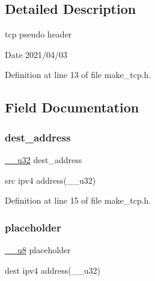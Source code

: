 \subsection{Detailed Description}
tcp pseudo header 

\begin{DoxyDate}{Date}
2021/04/03 
\end{DoxyDate}


Definition at line 13 of file make\+\_\+tcp.\+h.



\subsection{Field Documentation}
\mbox{\label{structtcp__pseudo__header_ad1dfa6f7871245086b831aa281f958d5}} 
\subsubsection{\texorpdfstring{dest\+\_\+address}{dest\_address}}
{\footnotesize\ttfamily \hyperlink{asm__types_8h_a3acae9310e2c2e411e800a8a369171c6}{\+\_\+\+\_\+u32} dest\+\_\+address}



src ipv4 address(\+\_\+\+\_\+u32) 



Definition at line 15 of file make\+\_\+tcp.\+h.

\mbox{\label{structtcp__pseudo__header_ae4b2c60e0c518e7aec8d55eca6de4d4c}} 
\subsubsection{\texorpdfstring{placeholder}{placeholder}}
{\footnotesize\ttfamily \hyperlink{asm__types_8h_a77f8102529baef48621b98012524115d}{\+\_\+\+\_\+u8} placeholder}



dest ipv4 address(\+\_\+\+\_\+u32) 



